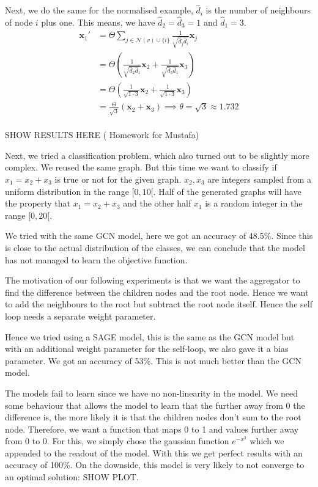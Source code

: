 \documentclass[a4paper,12pt]{article}
\begin{document}
Next, we do the same for the normalised example, $\hat{d}_{i}$ is the number of neighbours of node $i$ plus one. This means, we have $\hat{d}_{2} = \hat{d}_{3} = 1$ and $\hat{d}_{1}=3$.
\begin{align}
  \mathbf{x}_1' &= \Theta \sum_{j \in \mathcal{N}(v) \cup \{i\}} \frac{1}{\sqrt{\hat{d}_j \hat{d}_i}} \mathbf{x}_j\\
  &= \Theta  \left( \frac{1}{\sqrt{\hat{d}_2 \hat{d}_1}} \mathbf{x}_2 +  \frac{1}{\sqrt{\hat{d}_3 \hat{d}_1}} \mathbf{x}_3 \right)\\
  &= \Theta  \left( \frac{1}{\sqrt{1 \cdot 3}} \mathbf{x}_2 +  \frac{1}{\sqrt{1 \cdot 3}} \mathbf{x}_3 \right)\\
  &= \frac{\Theta}{\sqrt{3}}  \left(  \mathbf{x}_2 +   \mathbf{x}_3 \right) \implies \theta = \sqrt{3} \approx 1.732\\
\end{align}

SHOW RESULTS HERE (
Homework for Mustafa)

Next, we tried a classification problem, which also turned out to be slightly more complex. We reused the same graph. But this time we want to classify if $x_{1} = x_{2}+x_{3}$ is true or not for the given graph. \(x_2, x_3\) are integers sampled from a uniform distribution in the range \([0, 10[\). Half of the generated graphs will have the property that \(x_{1} = x_{2}+x_{3}\) and the other half \(x_1\) is a random integer in the range \([0, 20[\).

We tried with the same GCN model, here we got an accuracy of 48.5\%. Since this is close to the actual distribution of the classes, we can conclude that the model has not managed to learn the objective function.

The motivation of our following experiments is that we want the aggregator to find the difference between the children nodes and the root node. Hence we want to add the neighbours to the root but subtract the root node itself. Hence the self loop needs a separate weight parameter.

Hence we tried using a SAGE model, this is the same as the GCN model but with
an additional weight parameter for the self-loop, we also gave it a bias parameter. We got an accuracy of 53\%. %
This is not much better than the GCN model.

The models fail to learn since we have no non-linearity in the model. We need some behaviour
that allows the model to learn that the further away from 0 the difference is,
the more likely it is that the children nodes don't sum to the root node.
Therefore, we want a function that maps 0 to 1 and values further away from 0 to 0. 
For this, we simply chose the gaussian function \(e^{-x^2}\) which we
appended to the readout of the model. With this we get perfect results with an
accuracy of 100\%. On the downside, this model is very likely to not converge to an optimal solution: SHOW PLOT.
\end{document}

